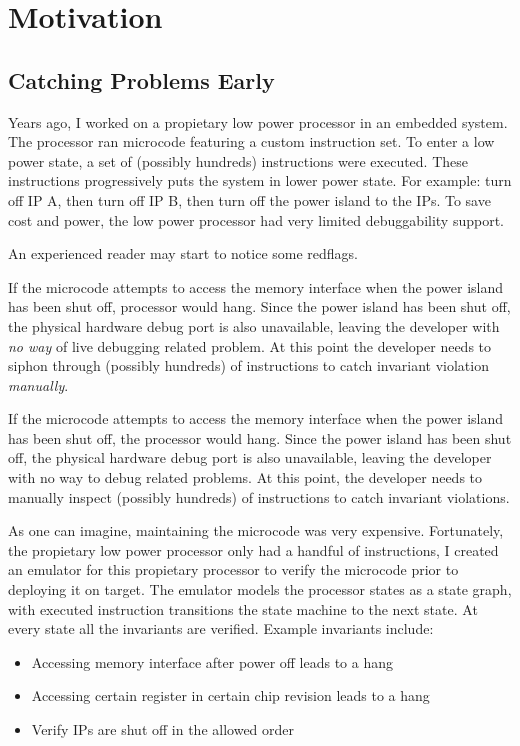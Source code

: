 \chapter{Motivation}

\section{Catching Problems Early}

Years ago, I worked on a propietary low power processor in an embedded system.
The processor ran microcode featuring a custom instruction set. To enter a low
power state, a set of (possibly hundreds) instructions were executed. These
instructions progressively puts the system in lower power state. For example:
turn off IP A, then turn off IP B, then turn off the power island to the IPs. To
save cost and power, the low power processor had very limited debuggability
support.\newline

An experienced reader may start to notice some redflags.\newline

If the microcode attempts to access the memory interface when the power island
has been shut off, processor would hang. Since the power island has been shut
off, the physical hardware debug port is also unavailable, leaving the developer
with \textit{no way} of live debugging related problem. At this point the
developer needs to siphon through (possibly hundreds) of instructions to catch
invariant violation \textit{manually}.\newline

If the microcode attempts to access the memory interface when the power island
has been shut off, the processor would hang. Since the power island has been
shut off, the physical hardware debug port is also unavailable, leaving the
developer with no way to debug related problems. At this point, the developer
needs to manually inspect (possibly hundreds) of instructions to catch invariant
violations.\newline

As one can imagine, maintaining the microcode was very expensive. Fortunately,
the propietary low power processor only had a handful of instructions, I created
an emulator for this propietary processor to verify the microcode prior to
deploying it on target. The emulator models the processor states as a state
graph, with executed instruction transitions the state machine to the next
state. At every state all the invariants are verified. Example invariants 
include:
\begin{itemize}
    \item Accessing memory interface after power off leads to a hang
    \item Accessing certain register in certain chip revision leads to a hang 
    \item Verify IPs are shut off in the allowed order
\end{itemize}

